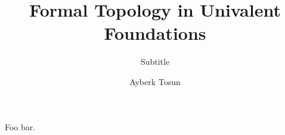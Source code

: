 

\title{Formal Topology in Univalent Foundations}
\subtitle{Subtitle}
\author{Ayberk Tosun}





\newcommand{\reals}{\mathbb{R}}
\newcommand{\ball}[2]{\mathfrak{A}(#1, #2)}
\newcommand{\neighbourhood}[1]{\mathbf{N}(#1)}

\newcommand{\pity}[3]{\prod_{(#1~:~#2)} #3}
\newcommand{\sigmaty}[3]{\sum_{(#1~:~#2)} #3}
\newcommand{\univ}{\mathcal{U}}
\newcommand{\isaprop}[1]{\mathsf{IsProp}\left(#1\right)}
\newcommand{\abs}[1]{\left| #1 \right|}
\newcommand{\pow}[1]{\mathcal{P}\left(#1\right)}
\newcommand{\sub}[1]{\mathbf{Fam}\left(#1\right)}

\newcommand{\dcsubsetnm}{\mathsf{DCSubset}}
\newcommand{\dcsubset}[1]{\dcsubsetnm{}\left(#1\right)}

\newcommand{\posetstrnm}{\mathsf{PosetStr}}
\newcommand{\posetstr}[1]{\posetstrnm{}\left(#1\right)}

\newcommand{\framestrnm}{\mathsf{FrameStr}}
\newcommand{\framestr}[1]{\framestrnm{}\left(#1\right)}
\newcommand{\frameax}[1]{\mathsf{FrameAx}\left(#1\right)}

\newcommand{\is}{:\equiv}

\newcommand{\paragraphsummary}[1]{\paragraph*{#1}}

\setmainfont{XITS}



\maketitlepage{}

\begin{abstract}
  \lipsum[1-2]{}
\end{abstract}

\begin{acknowledgements}
  Foo bar.
\end{acknowledgements}

\makelists{}









\makebackmatter{}


